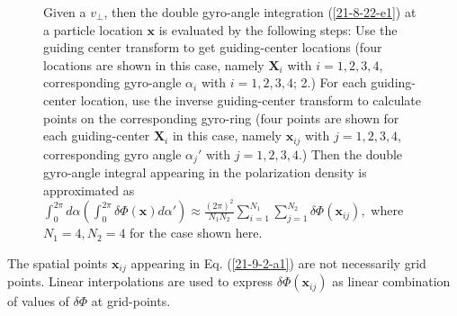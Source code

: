 \documentclass{llncs}
\begin{document}
\begin{figure}[h]
  \caption{\label{21-8-22-a1}Given a $v_{\perp}$, then the double gyro-angle
  integration (\ref{21-8-22-e1}) at a particle location $\mathbf{x}$ is
  evaluated by the following steps: Use the guiding center transform to get
  guiding-center locations (four locations are shown in this case, namely
  $\mathbf{X}_i$ with $i = 1, 2, 3, 4$, corresponding gyro-angle $\alpha_i$
  with $i = 1, 2, 3, 4$; 2.) For each guiding-center location, use the inverse
  guiding-center transform to calculate points on the corresponding gyro-ring
  (four points are shown for each guiding-center $\mathbf{X}_i$ in this case,
  namely $\mathbf{x}_{i j}$ with $j = 1, 2, 3, 4$, corresponding gyro angle
  $\alpha_j'$ with $j = 1, 2, 3, 4$.) Then the double gyro-angle integral
  appearing in the polarization density is approximated as
  $\label{21-9-2-a1} \int_0^{2 \pi} d \alpha \left( \int_0^{2 \pi} \delta \Phi
  (\mathbf{x}) d \alpha' \right) \approx \frac{(2 \pi)^2}{N_1 N_2}  \sum_{i =
  1}^{N_1} \sum_{j = 1}^{N_2} \delta \Phi (\mathbf{x}_{i j}),$
  where $N_1 = 4, N_2 = 4$ for the case shown here.}
\end{figure}

The spatial points $\mathbf{x}_{i j}$ appearing in Eq. (\ref{21-9-2-a1}) are
not necessarily grid points. Linear interpolations are used to express $\delta
\Phi (\mathbf{x}_{i j})$ as linear combination of values of $\delta \Phi$ at
grid-points.
\end{document}
